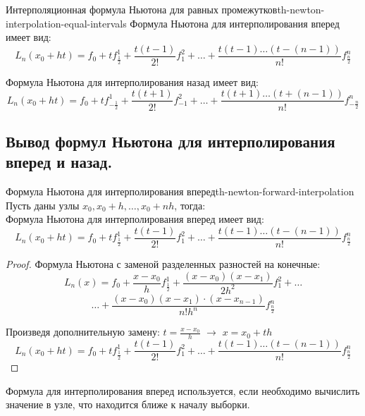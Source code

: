 \documentclass[14pt]{extarticle}
\begin{document}
    \begin{theorem}{Интерполяционная формула Ньютона для равных промежутков}{th-newton-interpolation-equal-intervals}
        Формула Ньютона для интерполирования вперед имеет вид:
        $$L_{n}(x_{0} + ht) = f_{0} + tf_{\frac{1}{2}}^{1} + \frac{t(t-1)}{2!}f_{1}^{2} + \ldots + \frac{t(t-1)\ldots(t-(n - 1))}{n!}f_{\frac{n}{2}}^{n}$$

        Формула Ньютона для интерполирования назад имеет вид:
        $$L_{n}(x_{0} + ht) = f_{0} + tf_{-\frac{1}{2}}^{1} + \frac{t(t+1)}{2!}f_{-1}^{2} + \ldots + \frac{t(t+1)\ldots(t+(n - 1))}{n!}f_{-\frac{n}{2}}^{n}$$
    \end{theorem}

\clearpage
\subsection{Вывод формул Ньютона для интерполирования вперед и назад.}

    \begin{theorem}{Формула Ньютона для интерполирования вперед}{th-newton-forward-interpolation}
        Пусть даны узлы $x_{0}, x_{0} + h, \ldots, x_{0} + nh$, тогда:\\

        Формула Ньютона для интерполирования вперед имеет вид:
        $$L_{n}(x_{0} + ht) = f_{0} + tf_{\frac{1}{2}}^{1} + \frac{t(t-1)}{2!}f_{1}^{2} + \ldots + \frac{t(t-1)\ldots(t-(n - 1))}{n!}f_{\frac{n}{2}}^{n}$$
        
        \begin{proof}      
            Формула Ньютона с заменой разделенных разностей на конечные:
            $$L_{n}(x) = f_{0} + \frac{x - x_{0}}{h}f_{\frac{1}{2}}^{1} + \frac{(x - x_{0})(x - x_{1})}{2h^{2}}f_{1}^{2} + \ldots$$ 
            $$\ldots + \frac{(x - x_{0})(x - x_{1}) \cdot (x-x_{n-1})}{n! h^{n}}f_{\frac{n}{2}}^{n}$$

            Произведя дополнительную замену: $t = \frac{x - x_{0}}{h}$ $\rightarrow$ $x = x_{0} + th$
            $$L_{n}(x_{0} + ht) = f_{0} + tf_{\frac{1}{2}}^{1} + \frac{t(t-1)}{2!}f_{1}^{2} + \ldots + \frac{t(t-1)\ldots(t-(n - 1))}{n!}f_{\frac{n}{2}}^{n}$$
        \end{proof}
    \end{theorem}

    Формула для интерполирования вперед используется, если необходимо вычислить значение в узле, что находится ближе к началу выборки.
\end{document}

